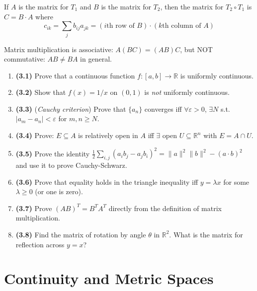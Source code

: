 \documentclass[11pt, letterpaper, openany]{book}
\newcounter{exercise}[chapter]
\begin{document}
If $A$ is the matrix for $T_1$ and $B$ is the matrix for $T_2$, then the matrix for $T_2 \circ T_1$ is $C = B \cdot A$ where
\[c_{ik} = \sum_j b_{ij} a_{jk} = (\text{$i$th row of $B$}) \cdot (\text{$k$th column of $A$})\]

\begin{remark}
Matrix multiplication is associative: $A(BC) = (AB)C$, but NOT commutative: $AB \neq BA$ in general.
\end{remark}

\begin{exercises}
\begin{enumerate}
    \item \textbf{(3.1)} Prove that a continuous function $f: [a,b] \to \mathbb{R}$ is uniformly continuous.
    
    \item \textbf{(3.2)} Show that $f(x) = 1/x$ on $(0,1)$ is \textit{not} uniformly continuous.
    
    \item \textbf{(3.3)} (\textit{Cauchy criterion}) Prove that $\{a_n\}$ converges iff $\forall \varepsilon > 0$, $\exists N$ s.t. $|a_m - a_n| < \varepsilon$ for $m, n \geq N$.
    
    \item \textbf{(3.4)} Prove: $E \subseteq A$ is relatively open in $A$ iff $\exists$ open $U \subseteq \mathbb{R}^n$ with $E = A \cap U$.
    
    \item \textbf{(3.5)} Prove the identity $\frac{1}{2}\sum_{i,j}(a_i b_j - a_j b_i)^2 = \|a\|^2\|b\|^2 - (a \cdot b)^2$ and use it to prove Cauchy-Schwarz.
    
    \item \textbf{(3.6)} Prove that equality holds in the triangle inequality iff $y = \lambda x$ for some $\lambda \geq 0$ (or one is zero).
    
    \item \textbf{(3.7)} Prove $(AB)^T = B^T A^T$ directly from the definition of matrix multiplication.
    
    \item \textbf{(3.8)} Find the matrix of rotation by angle $\theta$ in $\mathbb{R}^2$. What is the matrix for reflection across $y = x$?
\end{enumerate}
\end{exercises}

\chapter{Continuity and Metric Spaces}
\end{document}
